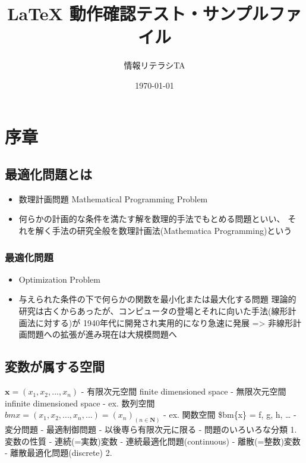 \documentclass[a4j,12pt]{jreport}
\title{ {\LaTeX} 動作確認テスト・サンプルファイル}
\author{情報リテラシTA}
\date{\today}
\begin{document}
\maketitle


\section{序章}\label{ux5e8fux7ae0}

\subsection{最適化問題とは}\label{ux6700ux9069ux5316ux554fux984cux3068ux306f}

\begin{itemize}
\tightlist
\item
  数理計画問題 Mathematical Programming Problem
\item
  何らかの計画的な条件を満たす解を数理的手法でもとめる問題といい、
  それを解く手法の研究全般を数理計画法(Mathematica Programming)という
\end{itemize}

\subsubsection{最適化問題}\label{ux6700ux9069ux5316ux554fux984c}

\begin{itemize}
\tightlist
\item
  Optimization Problem
\item
  与えられた条件の下で何らかの関数を最小化または最大化する問題
  理論的研究は古くからあったが、コンピュータの登場とそれに向いた手法(線形計画法に対する)が
  1940年代に開発され実用的になり急速に発展 =\textgreater{}
  非線形計画問題への拡張が進み現在は大規模問題へ
\end{itemize}

\subsection{変数が属する空間}\label{ux5909ux6570ux304cux5c5eux3059ux308bux7a7aux9593}

\(\bm{x} = (x_1, x_2, ..., x_n)\) - 有限次元空間 finite dimensioned
space - 無限次元空間 infinite dimensioned space - ex. 数列空間
\(bm{x} = (x_1, x_2, ..., x_n, ...) = (x_n)_(n\in{\bm{N}})\) - ex.
関数空間 \$bm\{x\} = f, g, h, \ldots{} - 変分問題 - 最適制御問題 -
以後専ら有限次元に限る - 問題のいろいろな分類 1. 変数の性質 -
連続(=実数)変数 - 連続最適化問題(continuous) - 離散(=整数)変数 -
離散最適化問題(discrete) 2.
\end{document}
